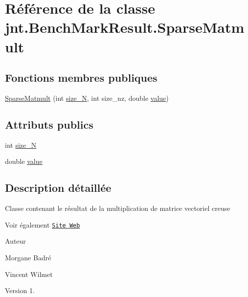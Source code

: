 \hypertarget{classjnt_1_1BenchMarkResult_1_1SparseMatmult}{\section{Référence de la classe jnt.\-Bench\-Mark\-Result.\-Sparse\-Matmult}
\label{classjnt_1_1BenchMarkResult_1_1SparseMatmult}
}
\subsection*{Fonctions membres publiques}
\begin{DoxyCompactItemize}
\item 
\hyperlink{classjnt_1_1BenchMarkResult_1_1SparseMatmult_ae40dc2e67e1e88d7daa0bd42db63c430}{Sparse\-Matmult} (int \hyperlink{classjnt_1_1BenchMarkResult_1_1SparseMatmult_a10bd94e346f3cf77c5a84fec1aa4a7d9}{size\-\_\-\-N}, int size\-\_\-nz, double \hyperlink{classjnt_1_1BenchMarkResult_1_1SparseMatmult_aa59accc2a3a250fcfbea547a16633082}{value})
\end{DoxyCompactItemize}
\subsection*{Attributs publics}
\begin{DoxyCompactItemize}
\item 
int \hyperlink{classjnt_1_1BenchMarkResult_1_1SparseMatmult_a10bd94e346f3cf77c5a84fec1aa4a7d9}{size\-\_\-\-N}
\item 
double \hyperlink{classjnt_1_1BenchMarkResult_1_1SparseMatmult_aa59accc2a3a250fcfbea547a16633082}{value}
\end{DoxyCompactItemize}


\subsection{Description détaillée}
Classe contenant le résultat de la multiplication de matrice vectoriel creuse \begin{DoxySeeAlso}{Voir également}
\href{http://www.cs.cmu.edu/~scandal/cacm/node9.html}{\tt Site Web} 
\end{DoxySeeAlso}
\begin{DoxyAuthor}{Auteur}

\begin{DoxyItemize}
\item Morgane Badré 
\item Vincent Wilmet 
\end{DoxyItemize}
\end{DoxyAuthor}
\begin{DoxyVersion}{Version}
1. 
\end{DoxyVersion}


